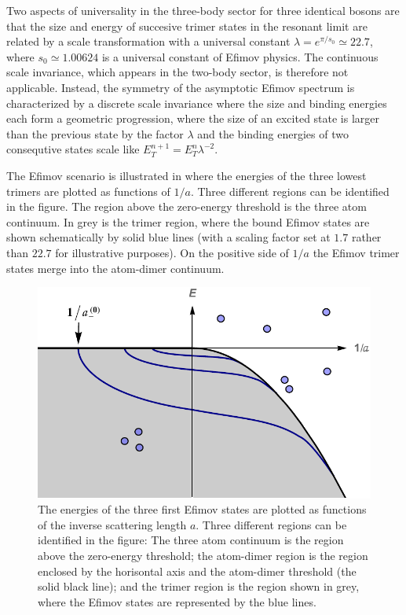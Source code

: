 Two aspects of universality in the three-body sector for three identical bosons are that the size and energy of succesive trimer states in the resonant limit are related by a scale transformation with a universal constant $\lambda = e^{\pi/s_0} \simeq 22.7$, where $s_0 \simeq 1.00624$ is a universal constant of Efimov physics. The continuous scale invariance, which appears in the two-body sector, is therefore not applicable. Instead, the symmetry of the asymptotic Efimov spectrum is characterized by a discrete scale invariance where the size and binding energies each form a geometric progression, where the size of an excited state is larger than the previous state by the factor $\lambda$ and the binding energies of two consequtive states scale like $E_T^{n+1} = E_T^{n}\lambda^{-2}$. 

The Efimov scenario is illustrated in  where the energies of the three lowest trimers are plotted as functions of $1/a$. Three different regions can be identified in the figure. The region above the zero-energy threshold is the three atom continuum. In grey is the trimer region, where the bound Efimov states are shown schematically by solid blue lines (with a scaling factor set at $1.7$ rather than $22.7$ for illustrative purposes). On the positive side of $1/a$ the Efimov trimer states merge into the atom-dimer continuum.

\begin{figure}
	\centering
	\includegraphics[width=0.75\linewidth]{efimov_spec}
	\caption{The energies of the three first Efimov states are plotted as functions of the inverse scattering length $a$. Three different regions can be identified in the figure: The three atom continuum is the region above the zero-energy threshold; the atom-dimer region is the region enclosed by the horisontal axis and the atom-dimer threshold (the solid black line); and the trimer region is the region shown in grey, where the Efimov states are represented by the blue lines.}\label{fig:efimov}
\end{figure} 

